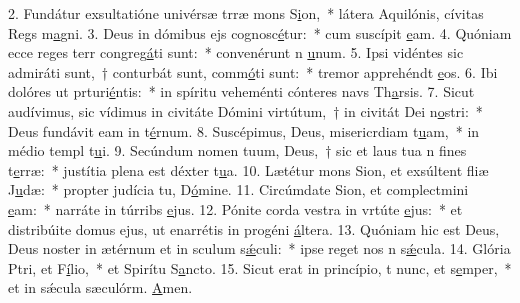 2. Fundátur exsultatióne univérsæ trræ mons S\uline{i}on,~* látera Aquilónis, cívitas Regs m\uline{a}gni.
3. Deus in dómibus ejs cognosc\uline{é}tur:~* cum suscípit \uline{e}am.
4. Quóniam ecce reges terr congreg\uline{á}ti sunt:~* convenérunt n \uline{u}num.
5. Ipsi vidéntes sic admiráti sunt,~† conturbát sunt, comm\uline{ó}ti sunt:~* tremor apprehéndt \uline{e}os.
6. Ibi dolóres ut prturi\uline{é}ntis:~* in spíritu veheménti cónteres navs Th\uline{a}rsis.
7. Sicut audívimus, sic vídimus in civitáte Dómini virtútum,~† in civitát Dei n\uline{o}stri:~* Deus fundávit eam in t\uline{é}rnum.
8. Suscépimus, Deus, misericrdiam t\uline{u}am,~* in médio templ t\uline{u}i.
9. Secúndum nomen tuum, Deus,~† sic et laus tua n fines t\uline{e}rræ:~* justítia plena est déxter t\uline{u}a.
10. Lætétur mons Sion, et exsúltent fliæ J\uline{u}dæ:~* propter judícia tu, D\uline{ó}mine.
11. Circúmdate Sion, et complectmini \uline{e}am:~* narráte in túrribs \uline{e}jus.
12. Pónite corda vestra in vrtúte \uline{e}jus:~* et distribúite domus ejus, ut enarrétis in progéni \uline{á}ltera.
13. Quóniam hic est Deus, Deus noster in ætérnum et in sculum s\uline{ǽ}culi:~* ipse reget nos n s\uline{ǽ}cula.
14. Glória Ptri, et F\uline{í}lio,~* et Spirítu S\uline{a}ncto.
15. Sicut erat in princípio, t nunc, et s\uline{e}mper,~* et in sǽcula sæculórm. \uline{A}men.

